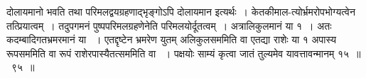 \documentclass[11pt, openany]{book}
\begin{document}
\begin{sloppypar}
\noindent दोलायमानो भवति तथा परिमलद्वयग्रहणाद्भृङ्गोऽपि दोलायमान इत्यर्थः~। केतकीमाल-त्योर्भ्रमरोपभोग्यत्वेन तत्प्रियात्वम्~। तदुपगमनं पुष्पपरिमलग्रहणेनेति परिमलयोर्दूतत्वम्~। अत्रालिकुलमानं या १~। अतः कदम्बादिगतभ्रमरमानं या ~। एतद्दृष्टेन भ्रमरेण युतम् अलिकुलसममिति \; वा एतद्या \; राशेः या १ अपास्य रूपसममिति वा \; रूपं राशेरपास्यैतत्सममिति वा ~। पक्षयोः साम्यं कृत्वा जातं तुल्यमेव यावत्तावन्मानम् १५~॥~९५~॥\\


\end{sloppypar}
\end{document}
